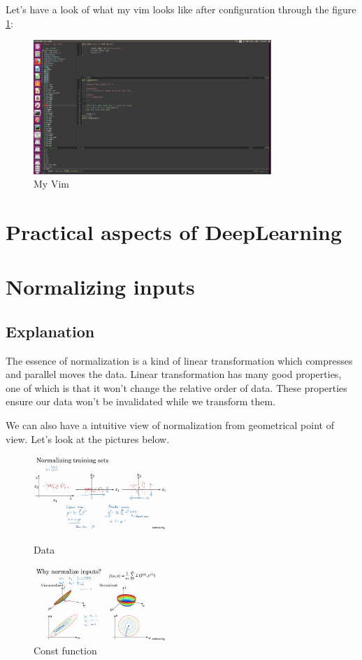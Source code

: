 \documentclass{article}
\begin{document}
Let's have a look of what my vim looks like after configuration through the figure \ref{my vim}:
\begin{figure}[htbp]
\centering
\includegraphics[width=9cm]{2018-06-09 09-28-03屏幕截图.png}
\caption{My Vim}
\label{my vim}
\end{figure}

\section*{Practical aspects of DeepLearning}
\setcounter{section}{0}
\section{Normalizing inputs}

\subsection{Explanation} 
 The essence of normalization is a kind of linear transformation which compresses and parallel moves the data. Linear transformation has many good properties, one of which is that it won't change the relative order of data. These properties ensure our data won't be invalidated while we transform them. \par
We can also have a intuitive view of normalization from geometrical point of view. Let's look at the pictures below.

\begin{figure}[htbp]
\begin{minipage}[t]{0.45\linewidth}
\centering
\includegraphics[width=5cm]{normalization_data.png}
\caption{Data}
\end{minipage}
\hfill
\begin{minipage}[t]{0.45\linewidth}
\centering
\includegraphics[width=5cm]{normalization_J_function.png}
\caption{Const function}
\label{J}
\end{minipage}
\end{figure}
\end{document}
